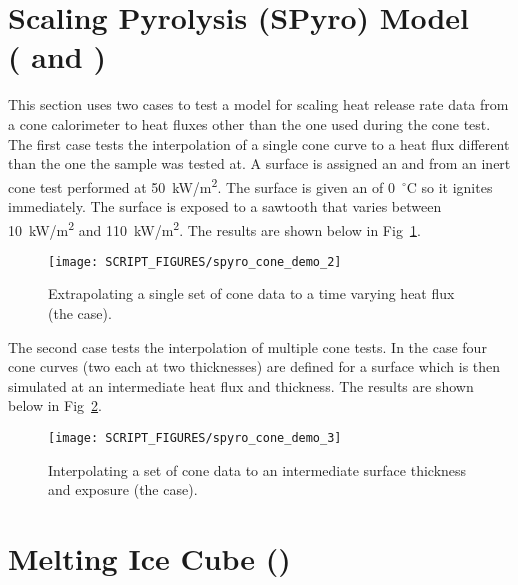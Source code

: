 \documentclass[11pt]{book}
\begin{document}
\newpage

\section{Scaling Pyrolysis (SPyro) Model \\
(\texorpdfstring{ and }{spyro\_cone\_demo\_2 and spyro\_cone\_demo\_3})}
\label{spyro_cone_demo_2}
\label{spyro_cone_demo_3}

This section uses two cases to test a model for scaling heat release rate data from a cone calorimeter to heat fluxes other than the one used during the cone test. The first case tests the interpolation of a single cone curve to a heat flux different than the one the sample was tested at. A surface is assigned an  and  from an inert cone test performed at 50~\si{kW/m^2}. The surface is given an  of 0~$^\circ$C so it ignites immediately. The surface is exposed to a sawtooth  that varies between 10~\si{kW/m^2} and 110~\si{kW/m^2}. The results are shown below in Fig~\ref{fig:spyro_cone_demo_2}.

\begin{figure}[!ht]
    \centering
    \texttt{[image: SCRIPT\_FIGURES/spyro\_cone\_demo\_2]}
    \caption[Check of the Scaling Pyrolysis (SPyro) model (the  case)]{Extrapolating a single set of cone data to a time varying heat flux (the  case).}
    \label{fig:spyro_cone_demo_2}
\end{figure}

The second case tests the interpolation of multiple cone tests. In the case four cone curves (two each at two thicknesses) are defined for a surface which is then simulated at an intermediate heat flux and thickness. The results are shown below in Fig~\ref{fig:spyro_cone_demo_3}.

\begin{figure}[!ht]
    \centering
    \texttt{[image: SCRIPT\_FIGURES/spyro\_cone\_demo\_3]}
    \caption[Check of the Scaling Pyrolysis (SPyro) model (the  case)]{Interpolating a set of cone data to an intermediate surface thickness and exposure (the  case).}
    \label{fig:spyro_cone_demo_3}
\end{figure}

\section{Melting Ice Cube (\texorpdfstring{}{ice\_cube})}
\label{ice_cube}
\end{document}
